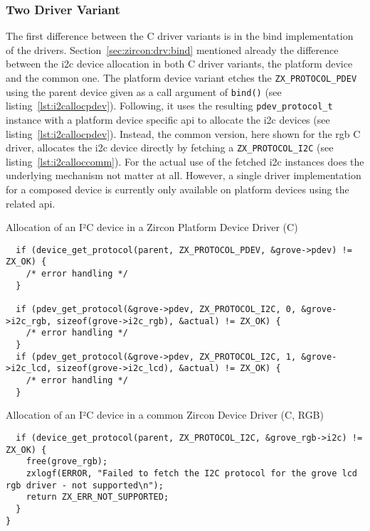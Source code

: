 \subsubsection*{Two Driver Variant} 
The first difference between the C driver variants is in the bind implementation of the drivers.
Section~\ref{sec:zircon:drv:bind} mentioned already the difference between the \ac{i2c} device allocation in both C driver variants, the platform device and the common one.
The platform device variant etches the \texttt{ZX_PROTOCOL_PDEV} using the parent device given as a call argument of \texttt{bind()} (see listing~\ref{lst:i2callocpdev}). 
Following, it uses the resulting \texttt{pdev_protocol_t} instance with a platform device specific \ac{api} to allocate the \ac{i2c} devices (see listing~\ref{lst:i2callocpdev}).
Instead, the common version, here shown for the \ac{rgb} C driver, allocates the \ac{i2c} device directly by fetching a \texttt{ZX_PROTOCOL_I2C} (see listing~\ref{lst:i2calloccomm}).
For the actual use of the fetched \ac{i2c} instances does the underlying mechanism not matter at all.
However, a single driver implementation for a composed device is currently only available on platform devices using the related \ac{api}.
%
\begin{listing}[H]
\caption{Allocation of an I²C device in a Zircon Platform Device Driver (C)}
\label{lst:i2callocpdev}
\begin{verbatim}
  if (device_get_protocol(parent, ZX_PROTOCOL_PDEV, &grove->pdev) != ZX_OK) {
    /* error handling */
  }

  if (pdev_get_protocol(&grove->pdev, ZX_PROTOCOL_I2C, 0, &grove->i2c_rgb, sizeof(grove->i2c_rgb), &actual) != ZX_OK) {
    /* error handling */
  }
  if (pdev_get_protocol(&grove->pdev, ZX_PROTOCOL_I2C, 1, &grove->i2c_lcd, sizeof(grove->i2c_lcd), &actual) != ZX_OK) {
    /* error handling */
  }
\end{verbatim}
\end{listing}
%
\begin{listing}[H]
\caption{Allocation of an I²C device in a common Zircon Device Driver (C, RGB)}
\label{lst:i2calloccomm}
\begin{verbatim}
  if (device_get_protocol(parent, ZX_PROTOCOL_I2C, &grove_rgb->i2c) != ZX_OK) {
    free(grove_rgb);
    zxlogf(ERROR, "Failed to fetch the I2C protocol for the grove lcd rgb driver - not supported\n");
    return ZX_ERR_NOT_SUPPORTED;
  }
}
\end{verbatim}
\end{listing}
